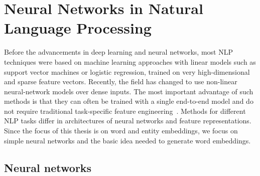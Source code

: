 \section{Neural Networks in Natural Language Processing}\label{sec:nn}
Before the advancements in deep learning and neural networks, most NLP techniques were based on machine learning approaches with linear models such as support vector machines or logistic regression, trained on very high-dimensional and sparse feature vectors. Recently, the field has changed to use non-linear neural-network models over dense inputs. The most important advantage of such methods is that they can often be trained with a single end-to-end model and do not require traditional task-specific feature engineering~. Methods for different NLP tasks differ in architectures of neural networks and feature representations. Since the focus of this thesis is on word and entity embeddings, we focus on simple neural networks and the basic idea needed to generate word embeddings.
\subsection{Neural networks}

